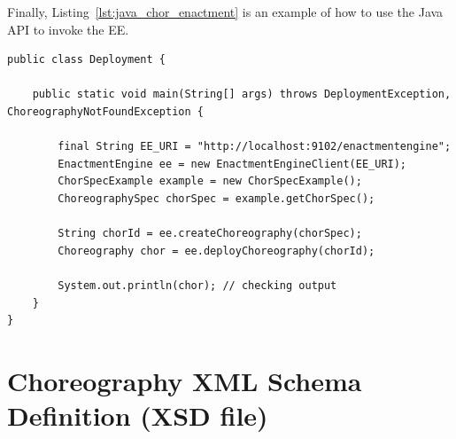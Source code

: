 Finally, Listing~\ref{lst:java_chor_enactment} is an example of how to use the Java API to invoke the EE.

{\footnotesize
\begin{lstlisting}[breaklines, caption={Deploying a choreography using the Java API.}, label={lst:java_chor_enactment}]
public class Deployment {

    public static void main(String[] args) throws DeploymentException, ChoreographyNotFoundException {

        final String EE_URI = "http://localhost:9102/enactmentengine";
        EnactmentEngine ee = new EnactmentEngineClient(EE_URI);
        ChorSpecExample example = new ChorSpecExample();
        ChoreographySpec chorSpec = example.getChorSpec();

        String chorId = ee.createChoreography(chorSpec);
        Choreography chor = ee.deployChoreography(chorId);

        System.out.println(chor); // checking output
    }
}
\end{lstlisting}
}

\section{Choreography XML Schema Definition (XSD file)}
\label{sec:xsd}

